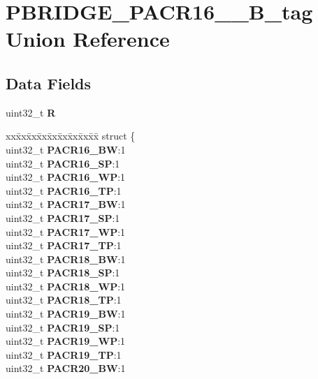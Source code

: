 \hypertarget{unionPBRIDGE__PACR16__23__32B__tag}{}\section{P\+B\+R\+I\+D\+G\+E\+\_\+\+P\+A\+C\+R16\+\_\+\_\+B\+\_\+tag Union Reference}
\label{unionPBRIDGE__PACR16__23__32B__tag}
\subsection*{Data Fields}
\begin{DoxyCompactItemize}
\item 
\mbox{\label{unionPBRIDGE__PACR16__23__32B__tag_aa7c684b0ab5dad1a398c88df5d282a67}} 
uint32\+\_\+t {\bfseries R}
\item 
\mbox{\label{unionPBRIDGE__PACR16__23__32B__tag_acc6935adf6f28ddcd8436b233ffa795d}} 
\begin{tabbing}
xx\=xx\=xx\=xx\=xx\=xx\=xx\=xx\=xx\=\kill
struct \{\\
\>uint32\_t {\bfseries PACR16\_BW}:1\\
\>uint32\_t {\bfseries PACR16\_SP}:1\\
\>uint32\_t {\bfseries PACR16\_WP}:1\\
\>uint32\_t {\bfseries PACR16\_TP}:1\\
\>uint32\_t {\bfseries PACR17\_BW}:1\\
\>uint32\_t {\bfseries PACR17\_SP}:1\\
\>uint32\_t {\bfseries PACR17\_WP}:1\\
\>uint32\_t {\bfseries PACR17\_TP}:1\\
\>uint32\_t {\bfseries PACR18\_BW}:1\\
\>uint32\_t {\bfseries PACR18\_SP}:1\\
\>uint32\_t {\bfseries PACR18\_WP}:1\\
\>uint32\_t {\bfseries PACR18\_TP}:1\\
\>uint32\_t {\bfseries PACR19\_BW}:1\\
\>uint32\_t {\bfseries PACR19\_SP}:1\\
\>uint32\_t {\bfseries PACR19\_WP}:1\\
\>uint32\_t {\bfseries PACR19\_TP}:1\\
\>uint32\_t {\bfseries PACR20\_BW}:1\\

\end{tabbing}
\end{DoxyCompactItemize}
